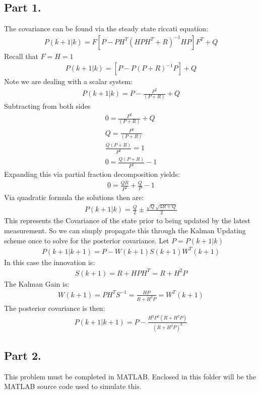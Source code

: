 \documentclass{article}
\begin{document}
\subsection*{Part 1.}
The covariance can be found via the steady state riccati equation:
\begin{align*}
P(k+1|k) = F[P-PH^T (HPH^T+R)^{-1} HP]F^T + Q
\end{align*}
Recall that $F=H=1$
\begin{align*}
P(k+1|k) = [P-P(P+R)^{-1} P] + Q
\end{align*}
Note we are dealing with a scalar system:
\begin{align*}
P(k+1|k) = P-\frac{P^2}{(P+R)} + Q
\end{align*}
Subtracting from both sides
\begin{align*}
0= \frac{P^2}{(P+R)} + Q \\
Q = \frac{P^2}{(P+R)} \\ 
\frac{Q(P+R)}{P^2} = 1 \\ 
0 = \frac{Q(P+R)}{P^2} - 1
\end{align*}
Expanding this via partial fraction decomposition yields:
\begin{align*}
0 = \frac{Q R}{P^2} + \frac{Q}{P} - 1
\end{align*}
Via quadratic formula the solutions then are:
\begin{align*}
P(k+1|k) = \frac{Q}{2} \pm \frac{\sqrt{Q} \sqrt{4R+Q}}{2}
\end{align*}
This represents the Covariance of the state prior to being updated by the latest measurement. So we can simply propagate this through the Kalman Updating scheme once to solve for the posterior covariance. Let $P=P(k+1|k)$
\begin{align*}
P(k+1|k+1) = P - W(k+1)S(k+1)W^T(k+1)
\end{align*}
In this case the innovation is:
\begin{align*}
S(k+1) = R+H P H^T = R+ H^2 P
\end{align*}
The Kalman Gain is:
\begin{align*}
W(k+1) = P H^T S^{-1} = \frac{H P}{R+H^2P} = W^T(k+1)
\end{align*}
The posterior covariance is then:
\begin{align*}
\boxed{ P(k+1|k+1) = P - \frac{H^2 P^2 (R+ H^2 P)}{(R+H^2P)^2} }
\end{align*}

\clearpage

\subsection*{Part 2.}
This problem must be completed in MATLAB. Enclosed in this folder will be the MATLAB source code used to simulate this.
\end{document}
